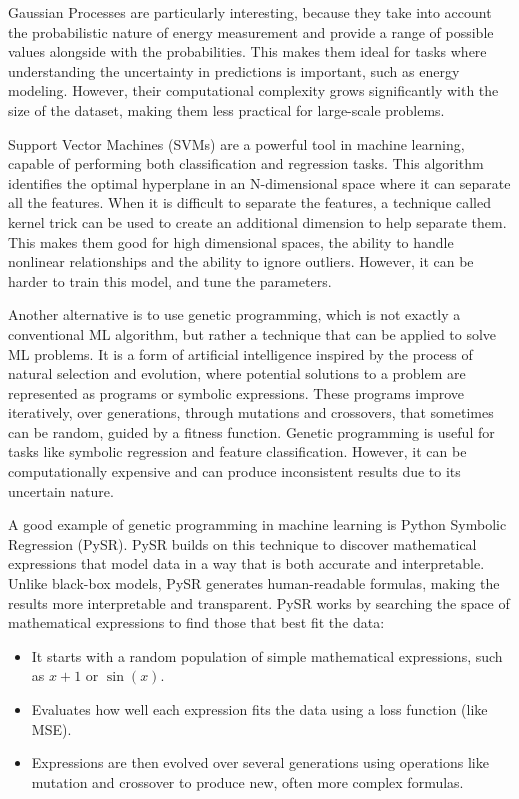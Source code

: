 Gaussian Processes are particularly interesting, because they take into account the probabilistic nature of energy measurement and provide a range of possible values alongside with the probabilities. This makes them ideal for tasks where understanding the uncertainty in predictions is important, such as energy modeling. However, their computational complexity grows significantly with the size of the dataset, making them less practical for large-scale problems.

Support Vector Machines (SVMs) are a powerful tool in machine learning, capable of performing both classification and regression tasks. This algorithm identifies the optimal hyperplane in an N-dimensional space where it can separate all the features. When it is difficult to separate the features, a technique called kernel trick can be used to create an additional dimension to help separate them. This makes them good for high dimensional spaces, the ability to handle nonlinear relationships and the ability to ignore outliers. However, it can be harder to train this model, and tune the parameters.

Another alternative is to use genetic programming, which is not exactly a conventional ML algorithm, but rather a technique that can be applied to solve ML problems. It is a form of artificial intelligence inspired by the process of natural selection and evolution, where potential solutions to a problem are represented as programs or symbolic expressions. These programs improve iteratively, over generations, through mutations and crossovers, that sometimes can be random, guided by a fitness function. Genetic programming is useful for tasks like symbolic regression and feature classification. However, it can be computationally expensive and can produce inconsistent results due to its uncertain nature.

A good example of genetic programming in machine learning is Python Symbolic Regression (PySR). PySR builds on this technique to discover mathematical expressions that model data in a way that is both accurate and interpretable. Unlike black-box models, PySR generates human-readable formulas, making the results more interpretable and transparent.
PySR works by searching the space of mathematical expressions to find those that best fit the data:

\begin{itemize}
    \item It starts with a random population of simple mathematical expressions, such as $x + 1$ or $\sin(x)$.
    \item Evaluates how well each expression fits the data using a loss function (like MSE).
    \item Expressions are then evolved over several generations using operations like mutation and crossover to produce new, often more complex formulas.
\end{itemize}

